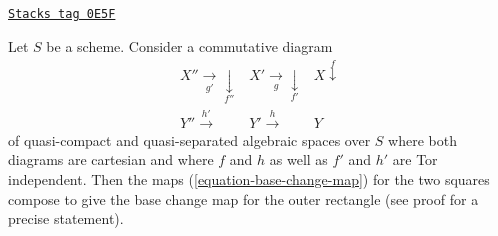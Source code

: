 \begin{lemma}
\label{spaces-duality-lemma-compose-base-change-maps-horizontal}
\href{https://stacks.math.columbia.edu/tag/0E5F}{\texttt{Stacks tag 0E5F}}

Let $S$ be a scheme. Consider a commutative diagram
$$
\begin{array}{ccc}X'' \underset{g'}{\longrightarrow}\underset{f''}{\downarrow} & X' \underset{g}{\longrightarrow}\underset{f'}{\downarrow} & X \overset{f}{\downarrow} \\ Y'' \overset{h'}{\longrightarrow} & Y' \overset{h}{\longrightarrow} & Y\end{array}
$$
of quasi-compact and quasi-separated algebraic spaces over $S$ where
both diagrams are cartesian and where $f$ and $h$
as well as $f'$ and $h'$ are Tor independent.
Then the maps (\ref{equation-base-change-map})
for the two squares compose to give the base
change map for the outer rectangle (see proof for a precise statement).
\end{lemma}

